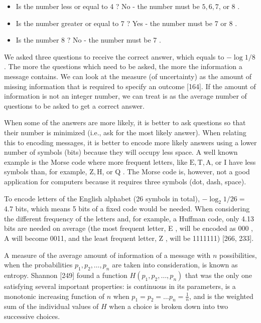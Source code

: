 \documentclass[10pt]{book}
\begin{document}
\begin{itemize}
  \item Is the number less or equal to 4 ? No - the number must be $5,6,7$, or 8 .
  \item Is the number greater or equal to 7 ? Yes - the number must be 7 or 8 .
  \item Is the number 8 ? No - the number must be 7 .
\end{itemize}

We asked three questions to receive the correct answer, which equals to $-\log 1 / 8$. The more the questions which need to be asked, the more the information a message contains. We can look at the measure (of uncertainty) as the amount of missing information that is required to specify an outcome [164]. If the amount of information is not an integer number, we can treat is as the average number of questions to be asked to get a correct answer.

When some of the answers are more likely, it is better to ask questions so that their number is minimized (i.e., ask for the most likely answer). When relating this to encoding messages, it is better to encode more likely answers using a lower number of symbols (bits) because they will occupy less space. A well known example is the Morse code where more frequent letters, like $\mathrm{E}, \mathrm{T}, \mathrm{A}$, or I have less symbols than, for example, $\mathrm{Z}, \mathrm{H}$, or Q . The Morse code is, however, not a good application for computers because it requires three symbols (dot, dash, space).

To encode letters of the English alphabet (26 symbols in total), $-\log _{2} 1 / 26=$ 4.7 bits, which means 5 bits of a fixed code would be needed. When considering the different frequency of the letters and, for example, a Huffman code, only 4.13 bits are needed on average (the most frequent letter, E , will be encoded as 000 , A will become 0011, and the least frequent letter, Z , will be 1111111) [266, 233].

A measure of the average amount of information of a message with $n$ possibilities, when the probabilities $p_{1}, p_{2}, \ldots, p_{n}$ are taken into consideration, is known as entropy. Shannon [249] found a function $H\left(p_{1}, p_{2}, \ldots, p_{n}\right)$ that was the only one satisfying several important properties: is continuous in its parameters, is a monotonic increasing function of $n$ when $p_{1}=p_{2}=\ldots p_{n}=\frac{1}{n}$, and is the weighted sum of the individual values of $H$ when a choice is broken down into two successive choices.
\end{document}
